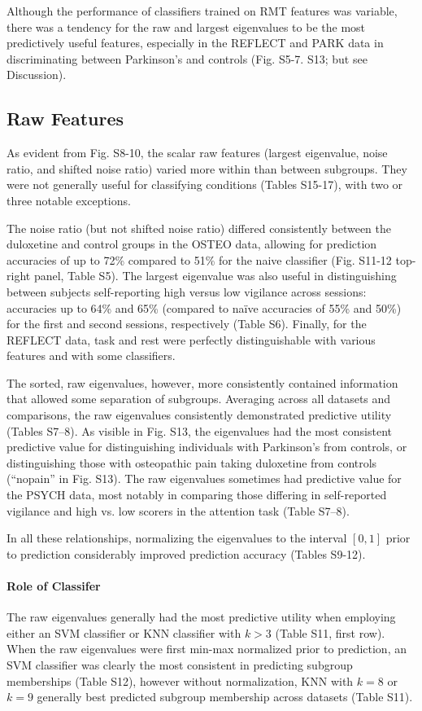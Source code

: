 Although the performance of classifiers trained on RMT features was variable, there was a tendency
for the raw and largest eigenvalues to be the most predictively useful features, especially in the
REFLECT and PARK data in discriminating between Parkinson's and controls (Fig. S5-7. S13; but see
Discussion).

\subsection{Raw Features}
As evident from Fig. S8-10, the scalar raw features (largest eigenvalue, noise ratio, and shifted
noise ratio) varied more within than between subgroups. They were not generally useful for
classifying conditions (Tables S15-17), with two or three notable exceptions.

The noise ratio (but not shifted noise ratio) differed consistently between the duloxetine and
control groups in the OSTEO data, allowing for prediction accuracies of up to 72\% compared to 51\%
for the naive classifier (Fig. S11-12 top-right panel, Table S5). The largest eigenvalue was also
useful in distinguishing between subjects self-reporting high versus low vigilance across sessions:
accuracies up to 64\% and 65\% (compared to naïve accuracies of 55\% and 50\%) for the first and
second sessions, respectively (Table S6). Finally, for the REFLECT data, task and rest were
perfectly distinguishable with various features and with some classifiers.

The sorted, raw eigenvalues, however, more consistently contained information that allowed some
separation of subgroups. Averaging across all datasets and comparisons, the raw eigenvalues
consistently demonstrated predictive utility (Tables S7--8). As visible in Fig. S13, the eigenvalues
had the most consistent predictive value for distinguishing individuals with Parkinson's from
controls, or distinguishing those with osteopathic pain taking duloxetine from controls (``nopain'' in
Fig. S13). The raw eigenvalues sometimes had predictive value for the PSYCH data, most notably in
comparing those differing in self-reported vigilance and high vs. low scorers in the attention task
(Table S7--8).

In all these relationships, normalizing the eigenvalues to the interval \([0,1]\) prior to
prediction considerably improved prediction accuracy (Tables S9-12).

\paragraph{Role of Classifer}
The raw eigenvalues generally had the most predictive utility when employing either an SVM
classifier or KNN classifier with \(k > 3\) (Table S11, first row). When the raw eigenvalues were
first min-max normalized prior to prediction, an SVM classifier was clearly the most consistent in
predicting subgroup memberships (Table S12), however without normalization, KNN with \(k = 8\) or
\(k = 9\) generally best predicted subgroup membership across datasets (Table S11).

